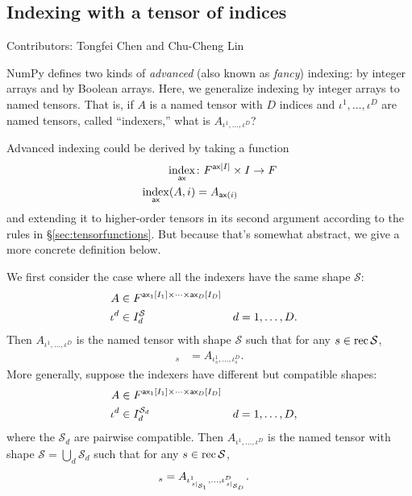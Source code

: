 \subsection{Indexing with a tensor of indices}

Contributors: Tongfei Chen and Chu-Cheng Lin

NumPy defines two kinds of \emph{advanced} (also known as \emph{fancy}) indexing: by integer arrays and by Boolean arrays. Here, we generalize indexing by integer arrays to named tensors. That is, if $A$ is a named tensor with $D$ indices and $\iota^1, \ldots, \iota^D$ are named tensors, called ``indexers,'' what is $A_{\iota^1, \ldots, \iota^D}$?

Advanced indexing could be derived by taking a function
\begin{align*}
  \nfun{ax}{index} &\colon F^{\nset{ax}{I}} \times I \rightarrow F \\
  \nfun{ax}{index}(A, i) &= A_{\nidx{ax}{i}}
\end{align*}
and extending it to higher-order tensors in its second argument according to the rules in \S\ref{sec:tensorfunctions}. But because that's somewhat abstract, we give a more concrete definition below.

We first consider the case where all the indexers have the same shape $\mathcal{S}$:
\begin{align*}
  A &\in F^{\nset{ax\sub{1}}{I_1} \times \cdots \times \nset{ax\sub{D}}{I_D}} \\
  \iota^d &\in I_d^{\mathcal{S}} & d &= 1, \ldots, D.
\end{align*}
Then $A_{\iota^1, \ldots, \iota^D}$ is the named tensor with shape $\mathcal{S}$ such that for any $s \in \rec{\mathcal{S}}$,
\begin{align*}
  [A_{\iota^1, \ldots, \iota^D}]_s &= A_{\iota^1_s, \ldots, \iota^D_s}.
\end{align*}
More generally, suppose the indexers have different but compatible shapes:
\begin{align*}
  A &\in F^{\nset{ax\sub{1}}{I_1} \times \cdots \times \nset{ax\sub{D}}{I_D}} \\
  \iota^d &\in I_d^{\mathcal{S}_d} & d &= 1, \ldots, D,
\end{align*}
where the $\mathcal{S}_d$ are pairwise compatible. Then $A_{\iota^1, \ldots, \iota^D}$ is the named tensor with shape $\mathcal{S} = \bigcup_d \mathcal{S}_d$ such that for any $s \in \rec{\mathcal{S}}$,
\begin{align*}
  [A_{\iota^1, \ldots, \iota^D}]_s &= A_{\iota^1_{\restrict{s}{\mathcal{S}_1}}, \ldots, \iota^D_{\restrict{s}{\mathcal{S}_D}}}.
\end{align*}

